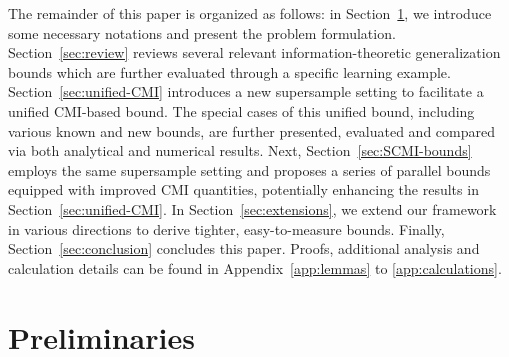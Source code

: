\documentclass[onecolumn,romanappendices,10pt]{IEEEtran}
\begin{document}
	The remainder of this paper is organized as follows: in Section~\ref{sec:preliminary}, we introduce some necessary notations and present the problem formulation. Section~\ref{sec:review} reviews several relevant information-theoretic generalization bounds which are further evaluated through a specific learning example. Section~\ref{sec:unified-CMI} introduces a new supersample setting to facilitate a unified CMI-based bound. The special cases of this unified bound, including various known and new bounds, are further presented, evaluated and compared via both analytical and numerical results. Next, Section~\ref{sec:SCMI-bounds} employs the same supersample setting and proposes a series of parallel bounds equipped with improved CMI quantities, potentially enhancing the results in Section~\ref{sec:unified-CMI}. In Section~\ref{sec:extensions}, we extend our framework in various directions to derive tighter, easy-to-measure bounds. Finally, Section~\ref{sec:conclusion} concludes this paper. Proofs, additional analysis and calculation details can be found in Appendix~\ref{app:lemmas} to \ref{app:calculations}.
	
	\section{Preliminaries}\label{sec:preliminary}
	
\end{document}
